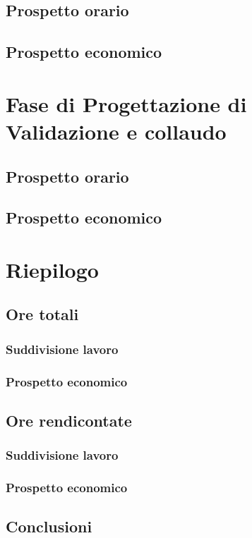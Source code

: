 \subsection{Prospetto orario}\label{5.4.1}

\subsection{Prospetto economico}\label{5.4.2}

\section{Fase di Progettazione di Validazione e collaudo}\label{5.5}

\subsection{Prospetto orario}\label{5.5.1}

\subsection{Prospetto economico}\label{5.5.2}

\section{Riepilogo}\label{5.6}

\subsection{Ore totali}\label{5.6.1}

\subsubsection{Suddivisione lavoro}\label{5.6.1.1}

\subsubsection{Prospetto economico}\label{5.6.1.2}

\subsection{Ore rendicontate}\label{5.6.2}

\subsubsection{Suddivisione lavoro}\label{5.6.2.1}

\subsubsection{Prospetto economico}\label{5.6.2.2}

\subsection{Conclusioni}\label{5.6.3}